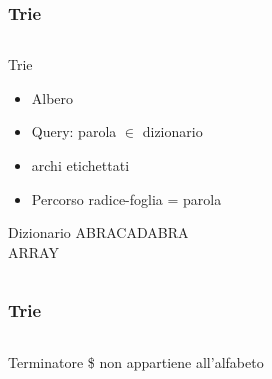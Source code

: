 \begin{frame}[fragile]
\frametitle{Trie}
\begin{columns}
\begin{column}{0.6\textwidth}
\begin{block}{Trie}
\begin{itemize}
\item
Albero
\item
Query: parola $\in$ dizionario
\item
archi etichettati
\item
Percorso radice-foglia = parola
\end{itemize}
\end{block}
\begin{block}{Dizionario}
ABRACADABRA\\
ARRAY\\
\end{block}
\end{column}
\begin{column}{0.4\textwidth}
\begin{center}
\end{center}
\end{column}
\end{columns}
\end{frame}

\begin{frame}[fragile]
\frametitle{Trie}
\begin{columns}
\begin{column}{0.6\textwidth}
\begin{block}{Terminatore}
\$ non appartiene all'alfabeto
\end{block}
\end{column}
\begin{column}{0.4\textwidth}
\begin{center}
\end{center}
\end{column}
\end{columns}
\end{frame}

